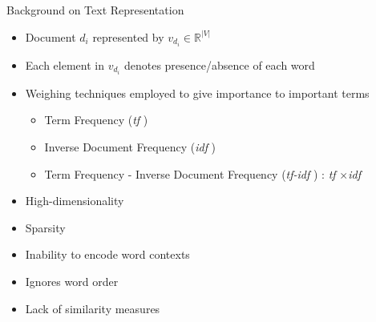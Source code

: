 \documentclass[10pt]{beamer}
\newcommand{\todo}[1]{\textcolor{red}{\textbf{TODO:} #1}}
\begin{document}
\begin{frame}{Background on Text Representation}
\vfill
{}
\begin{itemize}
	\vfill\item<2-> Document $d_{i}$ represented by $v_{d_{i}} \in \mathbb{R}^{|V|}$
	\vfill\item<3-> Each element in $v_{d_{i}}$ denotes presence/absence of each word
	\vfill\item<4-> Weighing techniques employed to give importance to important terms
	\begin{itemize}
		\vfill\item<4-> Term Frequency (\emph{tf} )
		\vfill\item<4-> Inverse Document Frequency (\emph{idf} )
		\vfill\item<4-> Term Frequency - Inverse Document Frequency (\emph{tf-idf} ) : \emph{tf} $\times$\emph{idf}
	\end{itemize}
\end{itemize}
\vfill
{}
\begin{itemize}
	\vfill\item<6-> High-dimensionality
	\vfill\item<7-> Sparsity
	\vfill\item<8-> Inability to encode word contexts
	\vfill\item<9-> Ignores word order
	\vfill\item<10-> Lack of similarity measures
\end{itemize}
\vfill
\end{frame}

\end{document}
